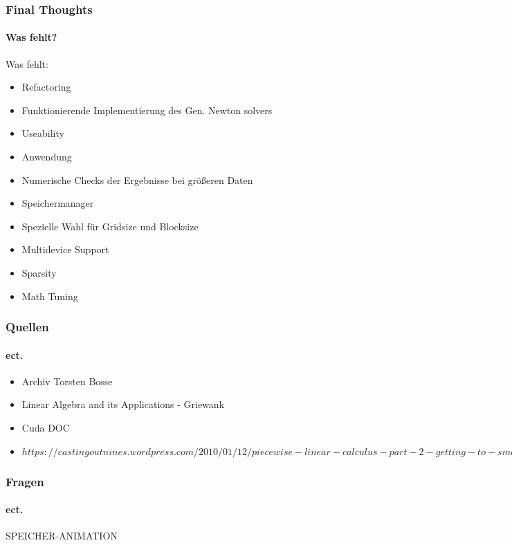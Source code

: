 \begin{frame}
	\frametitle{Final Thoughts}
	\framesubtitle{Was fehlt?}
	Was fehlt:
	\begin{itemize}
		\item <2-> Refactoring
		\item <3-> Funktionierende Implementierung des Gen. Newton solvers
		\item <4->Useability
		\item <5-> Anwendung
		\item <6->Numerische Checks der Ergebnisse bei größeren Daten
		\item <7-> Speichermanager
		\item <8-> Spezielle Wahl für Gridsize und Blocksize
		\item <9-> Multidevice Support
		\item <10-> Sparsity
		\item <11-> Math Tuning
	\end{itemize}
\end{frame}
\begin{frame}
	\frametitle{Quellen}
	\framesubtitle{ect.}
	\begin{itemize}
		\item Archiv Torsten Bosse
		\item Linear Algebra and its Applications - Griewank
		\item Cuda DOC
		\item $https://castingoutnines.wordpress.com/2010/01/12/piecewise-linear-calculus-part-2-getting-to-smoothness/$
	\end{itemize}
\end{frame}
\begin{frame}
	\frametitle{Fragen}
	\framesubtitle{ect.}
		\begin{center}
			SPEICHER-ANIMATION
		\end{center}
\end{frame}